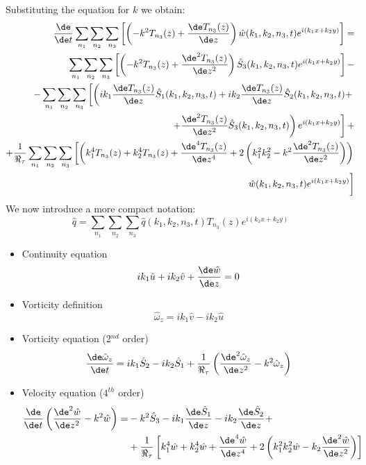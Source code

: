 Substituting the equation for $k$ we obtain:
\begin{equation}
\begin{split}
\frac{\de}{\de t}\sum_{n_1}\sum_{n_2}\sum_{n_3}\left[\left(-k^2T_{n_3}(z)+\frac{\de T_{n_3}(z)}{\de z} \right)\hat w(k_1,k_2,n_3,t)e^{i(k_1x+k_2y)}  \right]=\\
\sum_{n_1}\sum_{n_2}\sum_{n_3}\left[\left(-k^2T_{n_3}(z)+\frac{\de^2 T_{n_3}(z)}{\de z^2}\right)\hat S_3(k_1,k_2,n_3,t)e^{i(k_1x+k_2y)}  \right]-\\
-\sum_{n_1}\sum_{n_2}\sum_{n_3}\left[\left(ik_1\frac{\de T_{n_3}(z)}{\de z}\hat S_1(k_1,k_2,n_3,t)+ik_2\frac{\de T_{n_3}(z)}{\de z}\hat S_2(k_1,k_2,n_3,t)+ \right.\right.\\
\left.\left.+\frac{\de^2 T_{n_3}(z)}{\de z^2}\hat S_3(k_1,k_2,n_3,t)\right)e^{i(k_1x+k_2y)}  \right]+\\
+\frac{1}{\Re_\tau}\sum_{n_1}\sum_{n_2}\sum_{n_3}\left[\left(k_1^4T_{n_3}(z)+k_2^4 T_{n_3}(z)+ \frac{\de^4 T_{n_3}(z)}{\de z^4}+2\left( k_1^2k_2^2-k^2\frac{\de^2 T_{n_3}(z)}{\de z^2}\right)\right)\right. \\
\left.\hat w(k_1,k_2,n_3,t)e^{i(k_1x+k_2y)}  \vphantom{\frac{\de^2 T_{n_3}(z)}{\de z^2}}\right]
\end{split}
\end{equation}
We now introduce a more compact notation:
\[
\hat q=\sum_{n_1}\sum_{n_2}\sum_{n_3}\hat q(k_1,k_2,n_3,t)T_{n_3}(z)e^{i(k_1x+k_2y)}
\]
\begin{itemize}
\item Continuity equation
\[
ik_1\hat u+ik_2\hat v+\frac{\de \hat w}{\de z}=0
\]
\item Vorticity definition
\[
\hat \omega_z=ik_1\hat v-ik_2\hat u
\]
\item Vorticity equation (2$^{nd}$ order)
\[
\frac{\de\hat\omega_z}{\de t}=ik_1\hat S_2-ik_2\hat S_1+\frac{1}{\Re_\tau}\left(\frac{\de^2 \hat\omega_z}{\de z^2}-k^2\hat\omega_z  \right)
\]
\item Velocity equation ($4^{th}$ order)
\[
\begin{split}
\frac{\de}{\de t}\left(\frac{\de^2\hat w}{\de z^2}-k^2\hat w  \right)=&-k^2\hat S_3-ik_1\frac{\de \hat S_1}{\de z}-ik_2\frac{\de \hat S_2}{\de z}+\\
&+ \frac{1}{\Re_\tau}\left[k_1^4\hat w+k_2^4\hat w+\frac{\de^4 \hat w}{\de z^4}+2\left(k_1^2k_2^2\hat w-k_2\frac{\de^2\hat w}{\de z^2}  \right)\right]
\end{split}
\]
\end{itemize}


